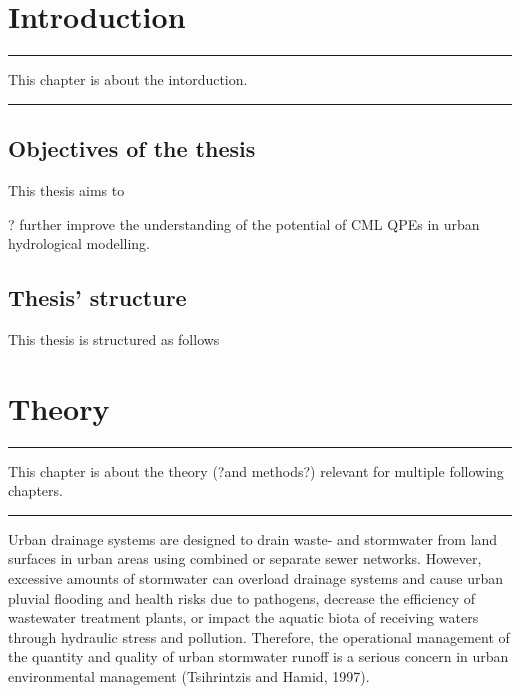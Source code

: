 \documentclass{ctuthesis}\usepackage[]{graphicx}\usepackage[]{color}
\begin{document}
        \maketitle
        
        


\chapter{Introduction} \label{chap1}

\rule{\textwidth}{0.4pt}
This chapter is about the intorduction. \newline
\rule[0.2cm]{\textwidth}{0.4pt}



\section{Objectives of the thesis}

This thesis aims to 

? further improve the understanding of the potential of CML QPEs in urban hydrological modelling.


\section{Thesis' structure}

This thesis is structured as follows

        
        


\chapter{Theory} \label{chap2}

\rule{\textwidth}{0.4pt}
This chapter is about the theory (?and methods?) relevant for multiple following chapters. \newline
\rule[0.2cm]{\textwidth}{0.4pt}


Urban drainage systems are designed to drain waste- and stormwater from land surfaces in urban areas using combined or separate sewer networks. However, excessive amounts of stormwater can overload drainage systems and cause urban pluvial flooding and health risks due to pathogens, decrease the efficiency of wastewater treatment plants, or impact the aquatic biota of receiving waters through hydraulic stress and pollution. Therefore, the operational management of the quantity and quality of urban stormwater runoff is a serious concern in urban environmental management (Tsihrintzis and Hamid, 1997).
\end{document}
